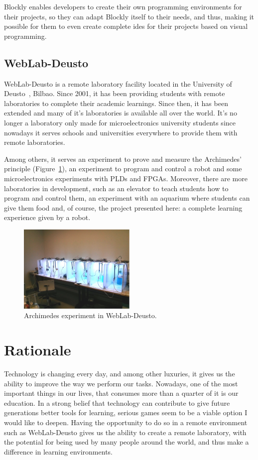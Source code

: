 Blockly enables developers to create their own programming environments for their projects, so they
can adapt Blockly itself to their needs, and thus, making it possible for them to even create
complete \acrshort{ide}s for their projects based on visual programming.

\subsection{WebLab-Deusto}

WebLab-Deusto is a remote laboratory facility located in the University of Deusto~\cite{weblab},
Bilbao. Since 2001, it has been providing students with remote laboratories to complete their
academic learnings. Since then, it has been extended and many of it's laboratories is available
all over the world. It's no longer a laboratory only made for microelectronics university students
since nowadays it serves schools and universities everywhere to provide them with remote
laboratories.

Among others, it serves an experiment to prove and measure the Archimedes' principle
(Figure~\ref{fig:archimedes}), an experiment to program and control a robot and some
microelectronics experiments with PLDs and FPGAs. Moreover, there are more laboratories in
development, such as an elevator to teach students how to program and control them, an experiment
with an aquarium where students can give them food and, of course, the project presented here: a
complete learning experience given by a robot.

\begin{figure}[!htbp]
	\centering
	\includegraphics[width=0.5\textwidth]{fig/archimedes}
	\caption{Archimedes experiment in WebLab-Deusto.}\label{fig:archimedes}
\end{figure}

\section{Rationale}

Technology is changing every day, and among other luxuries, it gives us the ability to improve the
way we perform our tasks. Nowadays, one of the most important things in our lives, that consumes
more than a quarter of it is our education. In a strong belief that technology can contribute to
give future generations better tools for learning, serious games seem to be a viable option I would
like to deepen. Having the opportunity to do so in a remote environment such as WebLab-Deusto gives
us the ability to create a remote laboratory, with the potential for being used by many people
around the world, and thus make a difference in learning environments.
